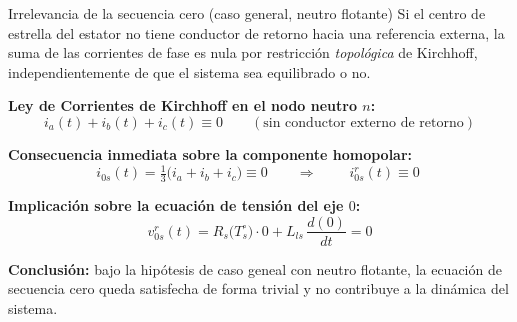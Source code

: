 \documentclass[aspectratio=169,t]{beamer}
\begin{document}
\begin{frame}{Irrelevancia de la secuencia cero (caso general, neutro flotante)}
{\small\color{uncGray}Si el centro de estrella del estator no tiene conductor de retorno hacia una referencia externa, la suma de las corrientes de fase es nula por restricción \emph{topológica} de Kirchhoff, independientemente de que el sistema sea equilibrado o no.}\par
\vspace{4mm}

\textbf{Ley de Corrientes de Kirchhoff en el nodo neutro $n$:}
\begin{equation*}
i_a(t) + i_b(t) + i_c(t) \equiv 0
\qquad (\text{sin conductor externo de retorno})
\end{equation*}

\textbf{Consecuencia inmediata sobre la componente homopolar:}
\begin{equation*}
i_{0s}(t) = \tfrac{1}{3}\big(i_a + i_b + i_c\big) \equiv 0
\qquad\Longrightarrow\qquad
\boxed{\;i_{0s}^{r}(t) \equiv 0\;}
\end{equation*}

\textbf{Implicación sobre la ecuación de tensión del eje $0$:}
\begin{equation*}
v_{0s}^{r}(t) = R_s\!\big(T_s^\circ\big)\cdot 0 + L_{ls}\,\frac{d(0)}{dt} = 0
\end{equation*}

{\small \textbf{Conclusión:} bajo la hipótesis de caso geneal con neutro flotante, la ecuación de secuencia cero queda satisfecha de forma trivial y no contribuye a la dinámica del sistema.}
\end{frame}
\end{document}
